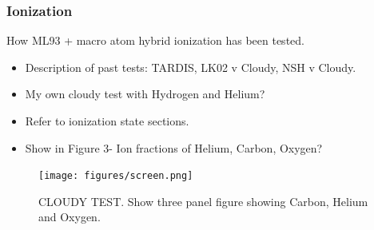 \documentclass[preprint, a4paper, 11pt]{aastex}
\begin{document}






\subsubsection{Ionization}

How ML93 + macro atom hybrid ionization has been tested.

\begin{itemize}
\item Description of past tests: TARDIS, LK02 v Cloudy, NSH v Cloudy.
\item  My own cloudy test with Hydrogen and Helium?
\item  Refer to ionization state sections. 
\item Show in Figure 3- Ion fractions of Helium, Carbon, Oxygen?
\end{itemize}


\begin{figure}[!h]
\centering
\texttt{[image: figures/screen.png]}
\caption{CLOUDY TEST. Show three panel figure showing Carbon, Helium and Oxygen.}
\label{ions}
\end{figure}
\end{document}
